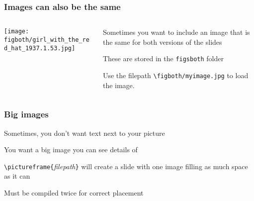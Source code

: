 \documentclass[aspectratio=169,handout]{beamer}
\begin{document}


	

\begin{frame}
	\frametitle{Images can also be the same}
	\begin{columns}[T] %
	\begin{column}{.48\textwidth}
		\texttt{[image: \\figboth/girl\_with\_the\_red\_hat\_1937.1.53.jpg]}
	\end{column}%
	\hfill%
	\begin{column}{.48\textwidth}
		\begin{witem}
		\item Sometimes you want to include an image that is the same for both versions
			of the slides
		\item These are stored in the \texttt{figs\textunderscore{}both} folder
		\item Use the filepath \texttt{\textbackslash{}figboth/myimage.jpg} to load the image.
	\end{witem}
	\end{column}%
	\end{columns}
\end{frame}



\begin{frame}
	\frametitle{Big images}
	\begin{witem}
		\item Sometimes, you don't want text next to your picture
		\item You want a big image you can see details of
		\item \texttt{\textbackslash{}pictureframe\{}\textit{filepath}\texttt{\}} will create
			a slide with one image filling as much space as it can
		\item Must be compiled twice for correct placement
	\end{witem}
\end{frame}
\end{document}
